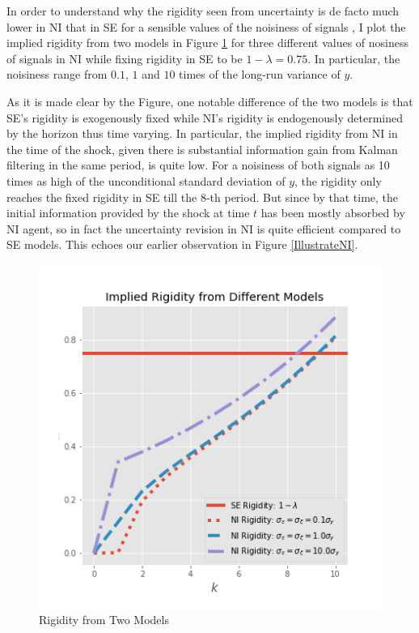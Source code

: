 \documentclass[]{article}
\begin{document}
	In order to understand why the rigidity seen from uncertainty is de facto much lower in NI that in SE for a sensible values of the noisiness of signals , I plot the implied rigidity from two models in Figure \ref{rigidity} for three different values of nosiness of signals in NI while fixing rigidity in SE to be $1-\lambda =0.75$. In particular, the noisiness range from $0.1$, $1$ and $10$ times of the long-run variance of $y$. 
	
	As it is made clear by the Figure, one notable difference of the two models is that SE's rigidity is exogenously fixed while NI's rigidity is endogenously determined by the horizon thus time varying. In particular, the implied rigidity from NI in the time of the shock, given there is substantial information gain from Kalman filtering in the same period, is quite low. For a noisiness of both signals as 10 times as high of the unconditional standard deviation of $y$, the rigidity only reaches the fixed rigidity in SE till the 8-th period. But since by that time, the initial information provided by the shock at time $t$ has been mostly absorbed by NI agent, so in fact the uncertainty revision in NI is quite efficient compared to SE models.  This echoes our earlier observation in Figure \ref{IllustrateNI}. 
	
	
	\begin{figure}[ht]
		\centering
		\includegraphics[width=13cm]{figures/rigidity.png} 
		\caption{Rigidity from Two Models}
		\label{rigidity}
	\end{figure}
	
\end{document}
